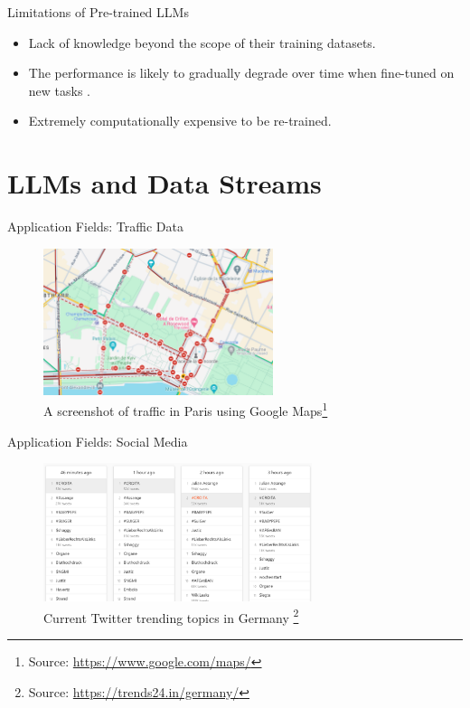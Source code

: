 \documentclass[t]{beamer}
\begin{document}
\begin{frame}{Limitations of Pre-trained LLMs}
  \vspace{1cm}
  \begin{itemize}
    \item Lack of knowledge beyond the scope of their training datasets.
    \newline
    \item The performance is likely to gradually degrade over time when fine-tuned on new tasks \cite{Shi24}.
    \newline
    \item Extremely computationally expensive to be re-trained.
  \end{itemize}
\end{frame}

\section{LLMs and Data Streams}
\begin{frame}{Application Fields: Traffic Data}
  \begin{figure}
    \centering
    \includegraphics[width=0.6\textwidth]{paris_traffic.png}
    \caption{A screenshot of traffic in Paris using Google Maps\footnote{Source: \url{https://www.google.com/maps/}}}
    \label{fig:paris}
\end{figure}
\end{frame}

\begin{frame}{Application Fields: Social Media}
  \begin{figure}
    \centering
    \includegraphics[width=0.7\textwidth]{trends.png}
    \caption{Current Twitter trending topics in Germany \footnote{Source: \url{https://trends24.in/germany/}}}
    \label{fig:trend}
\end{figure}
\end{frame}
\end{document}

